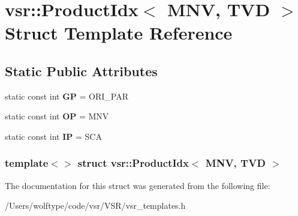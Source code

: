 \hypertarget{structvsr_1_1_product_idx_3_01_m_n_v_00_01_t_v_d_01_4}{\section{vsr\-:\-:Product\-Idx$<$ M\-N\-V, T\-V\-D $>$ Struct Template Reference}
\label{structvsr_1_1_product_idx_3_01_m_n_v_00_01_t_v_d_01_4}
}
\subsection*{Static Public Attributes}
\begin{DoxyCompactItemize}
\item 
\hypertarget{structvsr_1_1_product_idx_3_01_m_n_v_00_01_t_v_d_01_4_a68a08a476f5a37f3cb1c0fefd151f7e2}{static const int {\bfseries G\-P} = O\-R\-I\-\_\-\-P\-A\-R}\label{structvsr_1_1_product_idx_3_01_m_n_v_00_01_t_v_d_01_4_a68a08a476f5a37f3cb1c0fefd151f7e2}

\item 
\hypertarget{structvsr_1_1_product_idx_3_01_m_n_v_00_01_t_v_d_01_4_ae99e4f97c0a0957552969be143e59b44}{static const int {\bfseries O\-P} = M\-N\-V}\label{structvsr_1_1_product_idx_3_01_m_n_v_00_01_t_v_d_01_4_ae99e4f97c0a0957552969be143e59b44}

\item 
\hypertarget{structvsr_1_1_product_idx_3_01_m_n_v_00_01_t_v_d_01_4_a7ce54c3da932a1c825a8829f1d8a0e4f}{static const int {\bfseries I\-P} = S\-C\-A}\label{structvsr_1_1_product_idx_3_01_m_n_v_00_01_t_v_d_01_4_a7ce54c3da932a1c825a8829f1d8a0e4f}

\end{DoxyCompactItemize}
\subsubsection*{template$<$$>$ struct vsr\-::\-Product\-Idx$<$ M\-N\-V, T\-V\-D $>$}



The documentation for this struct was generated from the following file\-:\begin{DoxyCompactItemize}
\item 
/\-Users/wolftype/code/vsr/\-V\-S\-R/vsr\-\_\-templates.\-h\end{DoxyCompactItemize}
